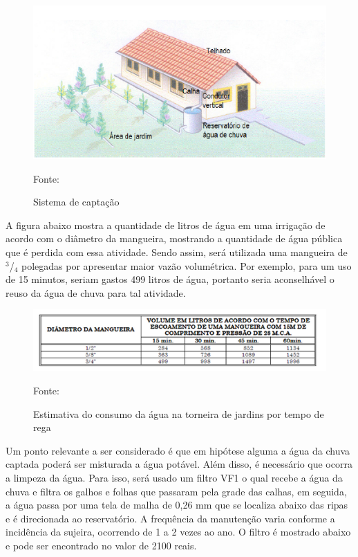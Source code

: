  \begin{figure}[h!]
	\centering
	\label{SistemaDeCaptacao}
		\includegraphics[keepaspectratio=true,scale=1.0]{figuras/SistemaDeCaptacao.png}
	\caption{Sistema de capta\c{c}\~ao}
	\small{Fonte:  \cite{WATERFALL}}
\end{figure}
 
 A figura abaixo mostra a quantidade de litros de \'agua em uma irriga\c{c}\~ao de acordo com o di\^ametro da mangueira, mostrando a quantidade de \'agua p\'ublica que \'e perdida com essa atividade. Sendo assim, ser\'a utilizada uma mangueira de $^{3}$/$_{4}$ polegadas por apresentar maior vaz\~ao volum\'etrica.  Por exemplo, para um uso de 15 minutos, seriam gastos 499 litros de \'agua, portanto seria aconselh\'avel o reuso da \'agua de chuva para tal atividade.
 
 \begin{figure}[h!]
	\centering
	\label{ConsumoAguaRega}
		\includegraphics[keepaspectratio=true,scale=1.0]{figuras/ConsumoAguaRega.png}
	\caption{Estimativa do consumo da \'agua na torneira de jardins por tempo de rega}
	\small{Fonte:  \cite{VICKERS}}
\end{figure}
 
 Um ponto relevante a ser considerado \'e que em hip\'otese alguma a \'agua da chuva captada poder\'a ser misturada a \'agua pot\'avel. Al\'em disso, \'e necess\'ario que ocorra a limpeza da \'agua. Para isso, ser\'a usado um filtro VF1 o qual recebe a \'agua da chuva e filtra os galhos e folhas que passaram pela grade das calhas, em seguida, a \'agua passa por uma tela de malha de 0,26 mm que se localiza abaixo das ripas e \'e direcionada ao reservat\'orio. A frequ\^encia da manuten\c{c}\~ao varia conforme a incid\^encia da sujeira, ocorrendo de 1 a 2 vezes ao ano. O filtro \'e mostrado abaixo e pode ser encontrado no valor de 2100 reais. \cite{VICKERS} 
 
